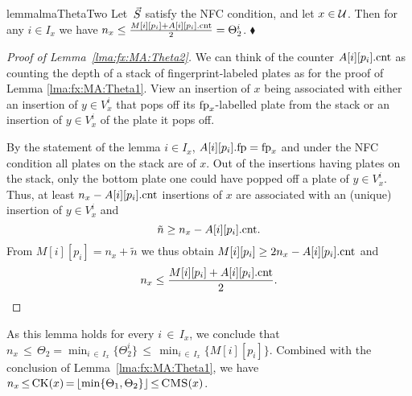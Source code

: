 \begin{restatable}{lemma}{lmaThetaTwo}\label{lma:fx:MA:Theta2}
Let~$\vec{S}$ satisfy the NFC condition, and let $x \in \mathcal{U}$.  Then for any $i \in I_x$ we have
		$n_x \leq  \frac{M[i][p_i] + A[i][p_i].\textup{cnt}}{2} =\Theta_2^i$.
	\hfill$\blacklozenge$
\end{restatable}

\begin{proof}[Proof of Lemma~\ref{lma:fx:MA:Theta2}]
	We can think of the counter $A[i][p_i].\textup{cnt}$ as counting the depth of a stack of fingerprint-labeled plates as for the proof of Lemma \ref{lma:fx:MA:Theta1}.
	View an insertion of $x$ being associated with either an insertion of $y \in V_x^i$ that pops off its $\textup{fp}_x$-labelled plate from the stack or an insertion of $y \in V_x^i$ of the plate it pops off. 
	
	By the statement of the lemma $i \in {I}_x$, $A[i][p_i].\textup{fp} = \textup{fp}_x$ and under the NFC condition all plates on the stack are of $x$. 
	Out of the insertions having plates on the stack, only the bottom plate one could have popped off a plate of $y \in V_x^i$. Thus, at least $n_x-A[i][p_i].\textup{cnt}$ insertions of $x$ are associated 
	with an (unique) insertion of $y \in V_x^i$ and
	\[
	\tilde{n} \geq n_x-A[i][p_i].\textup{cnt}.
	\]
	From $M[i][p_i] = n_x + \tilde{n}$ we thus obtain
	$M[i][p_i] \geq 2n_x -A[i][p_i].\textup{cnt}$ and
	\[
	n_x \leq \frac{M[i][p_i] + A[i][p_i].\textup{cnt}}{2}.
	\]
\end{proof}


As this lemma holds for every $i \,{\in}\, I_x$, we conclude that $n_x \,{\leq}\, \Theta_2=\min_{i \,{\in}\, I_x}\{\Theta^i_2\} \,{\leq}\, \min_{i \,{\in}\, I_x}\{M[i][p_i]\}$.  Combined with the conclusion of Lemma~\ref{lma:fx:MA:Theta1}, we have $n_x \,{\leq}\, \mathrm{CK}(x) \,{=}\, \lfloor \min\{\Theta_1,\Theta_2\} \rfloor \,{\leq}\, \textnormal{\textsc{CMS}}(x)$. 

